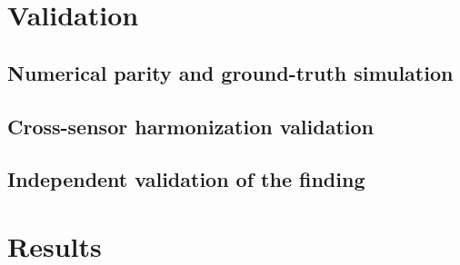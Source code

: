\documentclass[review]{elsarticle}
\begin{document}
\section{Validation}\label{sec:validation}

\subsection{Numerical parity and ground-truth simulation}\label{sec:parity}

\subsection{Cross-sensor harmonization validation}\label{sec:harmvalid}

\subsection{Independent validation of the finding}\label{sec:indval}

\section{Results}\label{sec:results}
\end{document}
